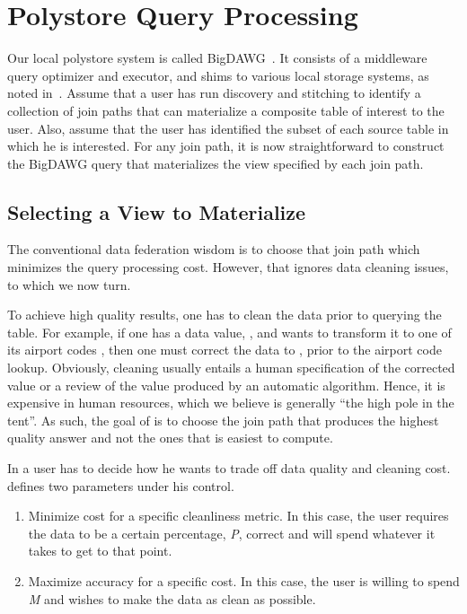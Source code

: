 \section{Polystore Query Processing}
\label{sec:curating}

Our local polystore system is called BigDAWG~\cite{DBLP:journals/pvldb/ElmoreDSBCGHHKK15}. It consists of a middleware query optimizer and executor, and shims to various local storage systems, as noted in~\cite{DBLP:journals/sigmod/DugganESBHKMMMZ15,DBLP:journals/pvldb/ElmoreDSBCGHHKK15}. Assume that a user has run discovery and stitching to identify a collection of join paths that can materialize a composite table of interest to the user.  Also, assume that the user has identified the subset of each source table in which he is interested. For any join path, it is now straightforward to construct the BigDAWG query that materializes the view specified by each join path. 

\subsection{Selecting a View to Materialize}


The conventional data federation wisdom is to choose that join path which minimizes the query processing cost. However, that ignores data cleaning issues, to which we now turn.

To achieve high quality results, one has to clean the data prior to querying the table. For example, if one has a data value, , and wants to transform it to one of its airport codes , then one must correct the data to , prior to the airport code lookup. Obviously, cleaning usually entails a human specification of the corrected value or a review of the value produced by an automatic algorithm. Hence, it is expensive in human resources, which we believe is generally ``the high pole in the tent''. As such, the goal of \dcv is to choose the join path that produces the highest quality answer and not the ones that is easiest to compute.



In \dcv a user has to decide how he wants to trade off data quality and cleaning cost. \dcv defines two parameters under his control.

\begin{enumerate}
\item Minimize cost for a specific cleanliness metric. In this case, the user requires the data to be a certain percentage, \emph{P}, correct and will spend whatever it takes to get to that point.

\item Maximize accuracy for a specific cost. In this case, the user is willing to spend \emph{M} and wishes to make the data as clean as possible.
\end{enumerate}


